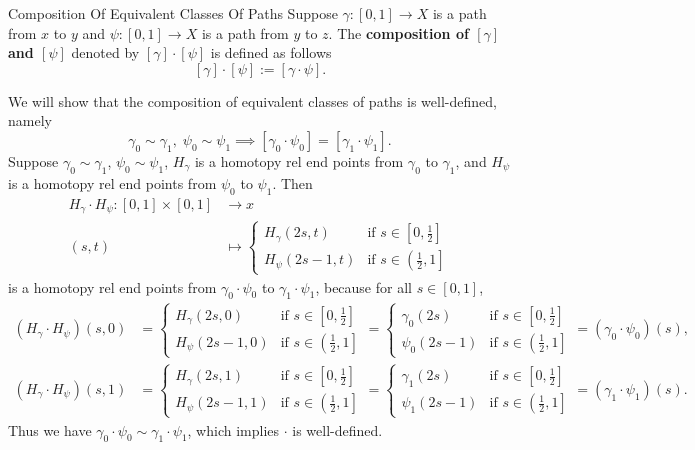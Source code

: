 \documentclass{report}
\begin{document}
\begin{definition}{Composition Of Equivalent Classes Of Paths}{}
	Suppose $\gamma: [0,1] \longrightarrow X$ is a path from $x$ to $y$ and $\psi: [0,1] \longrightarrow X$ is a path from $y$ to $z$. The \textbf{composition of $[\gamma]$ and $[\psi]$} denoted by $[\gamma]\cdot [\psi]$ is defined as follows
	\[
		[\gamma]\cdot [\psi]:=[\gamma\cdot \psi].
	\]
\end{definition}

\begin{prf}
	We will show that the composition of equivalent classes of paths is                                                                  well-defined, namely 
	\[
		\gamma_0\sim \gamma_1,\;\psi_0\sim \psi_1\implies [\gamma_0\cdot \psi_0] = [\gamma_1\cdot\psi_1].
	\]
	Suppose $\gamma_0\sim \gamma_1$, $\psi_0\sim \psi_1$, $H_{\gamma}$ is a homotopy rel end points from $\gamma_0$ to $\gamma_1$, and $H_{\psi}$ is a homotopy rel end points from $\psi_0$ to $\psi_1$. Then
	\begin{align*}
		H_{\gamma}\cdot H_{\psi}:[0,1]\times [0,1] &\longrightarrow x\\
		(s,t) &\longmapsto \begin{cases}
			H_{\gamma}(2s, t)&\text{if }s\in\left[0,\frac{1}{2}\right]\\
			H_{\psi}(2s-1, t)&\text{if }s\in\left(\left.\frac{1}{2},1\right]\right.
		\end{cases}
	\end{align*}
	is a homotopy rel end points from $\gamma_0\cdot\psi_0$ to $\gamma_1\cdot\psi_1$, because for all $s\in[0,1]$,
	\[\begin{aligned}
		\left(H_{\gamma}\cdot H_{\psi}\right)(s, 0)&=\begin{cases}
			H_{\gamma}(2s, 0)&\text{if }s\in\left[0,\frac{1}{2}\right]\\
			H_{\psi}(2s-1, 0)&\text{if }s\in\left(\left.\frac{1}{2},1\right]\right.
		\end{cases}=\begin{cases}
			\gamma_0(2s)&\text{if }s\in\left[0,\frac{1}{2}\right]\\
			\psi_0(2s-1)&\text{if }s\in\left(\left.\frac{1}{2},1\right]\right.
		\end{cases}=\left(\gamma_0\cdot \psi_0\right)(s),\\
		\left(H_{\gamma}\cdot H_{\psi}\right)(s, 1)&=\begin{cases}
			H_{\gamma}(2s, 1)&\text{if }s\in\left[0,\frac{1}{2}\right]\\
			H_{\psi}(2s-1, 1)&\text{if }s\in\left(\left.\frac{1}{2},1\right]\right.
		\end{cases}=\begin{cases}
			\gamma_1(2s)&\text{if }s\in\left[0,\frac{1}{2}\right]\\
			\psi_1(2s-1)&\text{if }s\in\left(\left.\frac{1}{2},1\right]\right.
		\end{cases}=\left(\gamma_1\cdot \psi_1\right)(s).
	\end{aligned}\]
	Thus we have $\gamma_0\cdot \psi_0\sim \gamma_1\cdot \psi_1$, which implies $\cdot$ is well-defined.
\end{prf}
\end{document}

